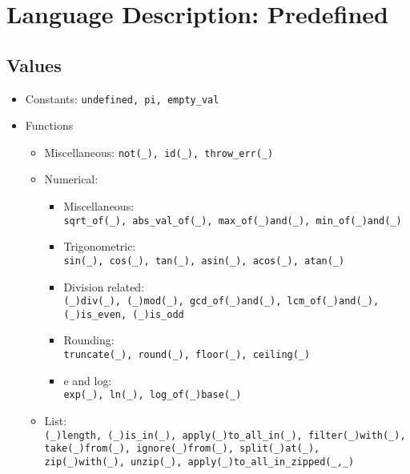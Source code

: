 \documentclass[diploma]{softlab-thesis}
\begin{document}
\newpage

\chapter{Language Description: Predefined}

\section{Values}

\begin{itemize}

\item Constants: \verb|undefined, pi, empty_val|

\item Functions
  \begin{itemize}

  \item Miscellaneous: \verb|not(_), id(_), throw_err(_)|

  \item Numerical:
    \begin{itemize}
    \item Miscellaneous: \\
      \verb|sqrt_of(_), abs_val_of(_), max_of(_)and(_), min_of(_)and(_)|
    \item Trigonometric: \\
      \verb|sin(_), cos(_), tan(_), asin(_), acos(_), atan(_)|
    \item Division related: \\
      \verb|(_)div(_), (_)mod(_), gcd_of(_)and(_), lcm_of(_)and(_),|
      \\
      \verb|(_)is_even, (_)is_odd|
    \item Rounding: \\
      \verb|truncate(_), round(_), floor(_), ceiling(_)|
    \item e and log: \\
      \verb|exp(_), ln(_), log_of(_)base(_)|
    \end{itemize}

  \item List:\\
    \verb|(_)length, (_)is_in(_), apply(_)to_all_in(_), filter(_)with(_),|
    \\
    \verb|take(_)from(_), ignore(_)from(_), split(_)at(_),|
    \\
    \verb|zip(_)with(_), unzip(_), apply(_)to_all_in_zipped(_,_)|


\end{itemize}
\end{itemize}
\end{document}
